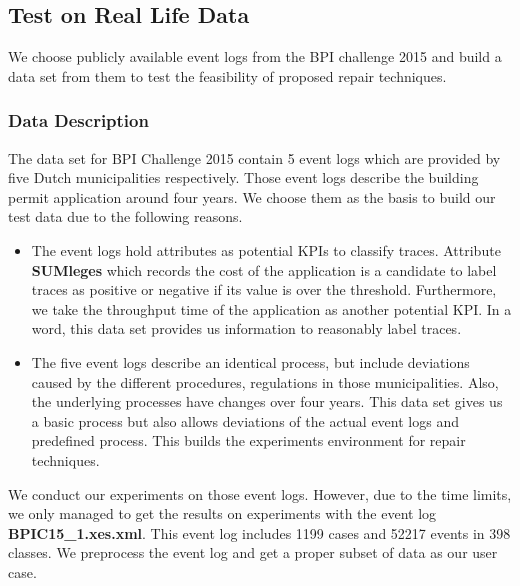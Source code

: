 \subsection{Test on Real Life Data}
We choose publicly available event logs from the BPI challenge 2015 and build a data set from them to test the feasibility of proposed repair techniques.
\subsubsection{Data Description}
The data set for BPI Challenge 2015 contain 5 event logs which are provided by five Dutch municipalities respectively. Those event logs describe the building permit application around four years. We choose them as the basis to build our test data due to the following reasons.
\begin{itemize}
	\item The event logs hold attributes as potential KPIs to classify traces. Attribute \textbf{SUMleges} which records the cost of the application is a candidate to label traces as positive or negative if its value  is over the threshold. Furthermore, we take the throughput time of the application as another potential KPI. 
	In a word, this data set provides us information to reasonably label traces.
	\item The five event logs describe an identical process, but include deviations caused by the different procedures, regulations in those municipalities. Also, the underlying processes have changes over four years.
	This data set gives us a basic process but also allows deviations of the actual event logs and predefined process. This builds the experiments environment for repair techniques.
\end{itemize}
We conduct our experiments on those event logs. However, due to the time limits, we only managed to get the results on experiments with the event log \textbf{BPIC15\_1.xes.xml}. This event log includes 1199 cases and 52217 events in 398 classes. We preprocess the event log and get a proper subset of data as our user case.  
